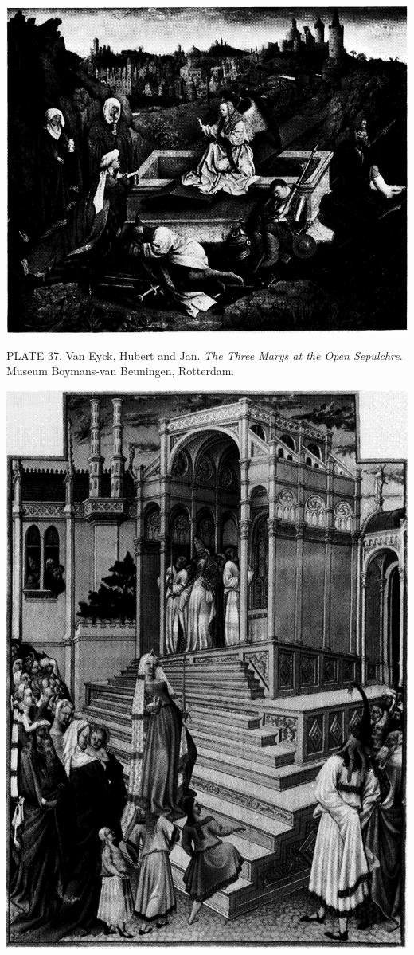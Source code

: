 \protect\hypertarget{20_ILLUSTRATIONS_FOLLOW_PAGE.xhtmlux5cux23id_32}{}{}\includegraphics{include/html/images/352_1.png}

PLATE 37. Van Eyck, Hubert and Jan. \emph{The Three Marys at the Open
Sepulchre}. Museum Boymans-van Beuningen, Rotterdam.

\protect\hypertarget{20_ILLUSTRATIONS_FOLLOW_PAGE.xhtmlux5cux23id_33}{}{}\includegraphics{include/html/images/353_1.png}

